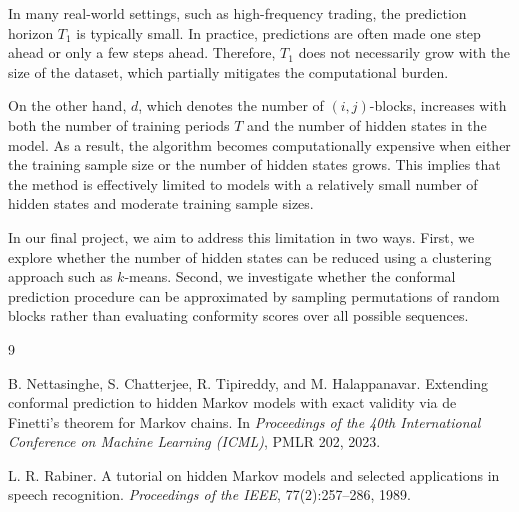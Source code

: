 \documentclass{article}
\begin{document}
In many real-world settings, such as high-frequency trading, the prediction horizon $T_1$ is typically small. In practice, predictions are often made one step ahead or only a few steps ahead. Therefore, $T_1$ does not necessarily grow with the size of the dataset, which partially mitigates the computational burden.

On the other hand, $d$, which denotes the number of $(i,j)$-blocks, increases with both the number of training periods $T$ and the number of hidden states in the model. As a result, the algorithm becomes computationally expensive when either the training sample size or the number of hidden states grows. This implies that the method is effectively limited to models with a relatively small number of hidden states and moderate training sample sizes.

In our final project, we aim to address this limitation in two ways. First, we explore whether the number of hidden states can be reduced using a clustering approach such as $k$-means. Second, we investigate whether the conformal prediction procedure can be approximated by sampling permutations of random blocks rather than evaluating conformity scores over all possible sequences.



\begin{thebibliography}{9}

B. Nettasinghe, S. Chatterjee, R. Tipireddy, and M. Halappanavar.
Extending conformal prediction to hidden Markov models with exact validity via
de Finetti’s theorem for Markov chains.
In \textit{Proceedings of the 40th International Conference on Machine Learning (ICML)},
PMLR 202, 2023.

L. R. Rabiner.
A tutorial on hidden Markov models and selected applications in speech recognition.
\textit{Proceedings of the IEEE}, 77(2):257--286, 1989.

\end{thebibliography}
\end{document}

